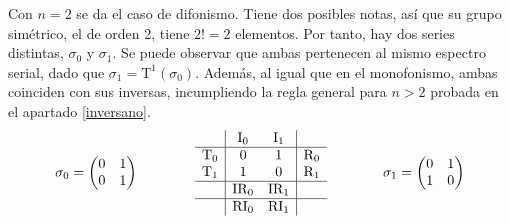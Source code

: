 		Con $n=2$ se da el caso de difonismo. Tiene dos posibles notas, así que su grupo simétrico, el de orden 2, tiene $2!=2$ elementos. Por tanto, hay dos series distintas, $\sigma_0$ y $\sigma_1$. Se puede observar que ambas pertenecen al mismo espectro serial, dado que $\sigma_1=\text{T}^1(\sigma_0)$. Además, al igual que en el monofonismo, ambas coinciden con sus inversas, incumpliendo la regla general para $n>2$ probada en el apartado \ref{inversano}.
		\[\sigma_0=\left(\begin{matrix}0&1\\0&1\end{matrix}\right)
		\qquad\qquad
		\begin{array}{l|cc|r}
			&\text{I}_{0}&\text{I}_{1}&\\
			\hline
			\text{T}_{0}&0&1&\text{R}_{0}\\
			\text{T}_{1}&1&0&\text{R}_{1}\\
			\hline
			&\text{IR}_{0}&\text{IR}_{1}&\\
			\hline
			&\text{RI}_{0}&\text{RI}_{1}&
		\end{array}
		\qquad\qquad
		\sigma_1=\left(\begin{matrix}0&1\\1&0\end{matrix}\right)\]